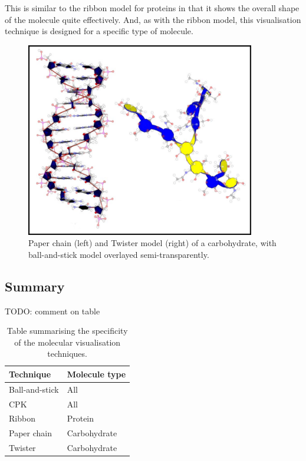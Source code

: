 This is similar to the ribbon model for proteins in that it shows the overall
shape of the molecule quite effectively. And, as with the ribbon model, this
visualisation technique is designed for a specific type of molecule.

\begin{figure}[h!]
  \begin{center}
    \includegraphics[width=100mm]{chain_twister}
  \end{center}
  \caption{Paper chain (left) and Twister model (right) of a carbohydrate, with
  ball-and-stick model overlayed semi-transparently.}
  \label{fig:background_chaintwister}
\end{figure}


\subsection{Summary}
\label{sub:background_summary}

TODO: comment on table

\begin{table}[h!]
  \begin{tabular}{ | l | l | }
  \hline
  Technique      & Molecule type  \\ \hline
  Ball-and-stick & All            \\ \hline
  CPK            & All            \\ \hline
  Ribbon         & Protein        \\ \hline
  Paper chain    & Carbohydrate   \\ \hline
  Twister        & Carbohydrate   \\ \hline
  \end{tabular}
  \caption{Table summarising the specificity of the molecular visualisation
  techniques.}
  \label{tab:background_molecular}
\end{table}

